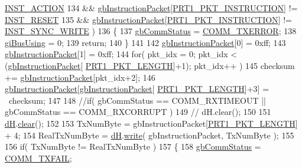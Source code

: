 \begin{DoxyCode}
      \hyperlink{dynamixel_8h_adea21b73305aa7a5b3317e299c616853}{INST\_ACTION}
134         && \hyperlink{classdynamixel_afd94dcf01b8e96298727776e222de722}{gbInstructionPacket}[\hyperlink{dynamixel_8h_a3da1d083c018994fb0c859f4e06e1f78}{PRT1\_PKT\_INSTRUCTION}] != 
      \hyperlink{dynamixel_8h_ad670526ca941302efb4a0d00e7dd43c0}{INST\_RESET}
135         && \hyperlink{classdynamixel_afd94dcf01b8e96298727776e222de722}{gbInstructionPacket}[\hyperlink{dynamixel_8h_a3da1d083c018994fb0c859f4e06e1f78}{PRT1\_PKT\_INSTRUCTION}] != 
      \hyperlink{dynamixel_8h_aeaa4b61ee11d45bd1a0cb932d7abaf77}{INST\_SYNC\_WRITE} )
136     \{
137         \hyperlink{classdynamixel_a5b603f6bed7ccc595f1f50bd6a6ebbfc}{gbCommStatus} = \hyperlink{dynamixel_8h_a1bd7c7b30db4f56dc80cef65ad38afff}{COMM\_TXERROR};
138         \hyperlink{classdynamixel_ad10e0e49f5fef04bf789a89c14cc470a}{giBusUsing} = 0;
139         \textcolor{keywordflow}{return};
140     \}
141     
142     \hyperlink{classdynamixel_afd94dcf01b8e96298727776e222de722}{gbInstructionPacket}[0] = 0xff;
143     \hyperlink{classdynamixel_afd94dcf01b8e96298727776e222de722}{gbInstructionPacket}[1] = 0xff;
144     \textcolor{keywordflow}{for}( pkt\_idx = 0; pkt\_idx < (\hyperlink{classdynamixel_afd94dcf01b8e96298727776e222de722}{gbInstructionPacket}[
      \hyperlink{dynamixel_8h_ab24601f91d0364e4b62edad3c2a0a5c4}{PRT1\_PKT\_LENGTH}]+1); pkt\_idx++ )
145         checksum += \hyperlink{classdynamixel_afd94dcf01b8e96298727776e222de722}{gbInstructionPacket}[pkt\_idx+2];
146     \hyperlink{classdynamixel_afd94dcf01b8e96298727776e222de722}{gbInstructionPacket}[\hyperlink{classdynamixel_afd94dcf01b8e96298727776e222de722}{gbInstructionPacket}[
      \hyperlink{dynamixel_8h_ab24601f91d0364e4b62edad3c2a0a5c4}{PRT1\_PKT\_LENGTH}]+3] = ~checksum;
147     
148     \textcolor{comment}{//if( gbCommStatus == COMM\_RXTIMEOUT || gbCommStatus == COMM\_RXCORRUPT )}
149     \textcolor{comment}{//  dH.clear();}
150 
151     \hyperlink{classdynamixel_ae003cc90ada6d7b70eaa4ea9d42d4deb}{dH}.\hyperlink{classdxl__hal_a004eedde5af69219d7288ec8ea97c89f}{clear}();
152 
153     TxNumByte = gbInstructionPacket[\hyperlink{dynamixel_8h_ab24601f91d0364e4b62edad3c2a0a5c4}{PRT1\_PKT\_LENGTH}] + 4;
154     RealTxNumByte = \hyperlink{classdynamixel_ae003cc90ada6d7b70eaa4ea9d42d4deb}{dH}.\hyperlink{classdxl__hal_a90106970438fb0ab65852730a1c0776a}{write}( gbInstructionPacket, TxNumByte );
155 
156     \textcolor{keywordflow}{if}( TxNumByte != RealTxNumByte )
157     \{
158         \hyperlink{classdynamixel_a5b603f6bed7ccc595f1f50bd6a6ebbfc}{gbCommStatus} = \hyperlink{dynamixel_8h_af88390c8be18c4079e65fd07b8d553be}{COMM\_TXFAIL};

\end{DoxyCode}
